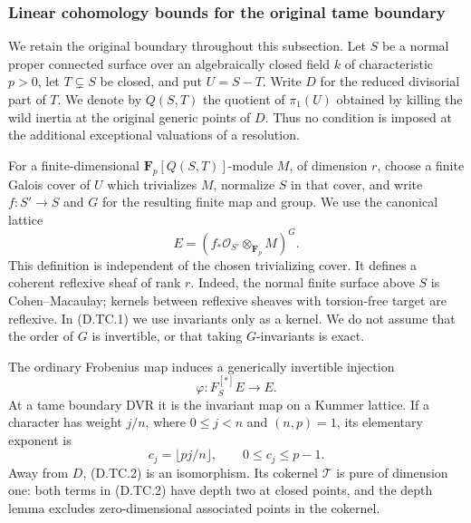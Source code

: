 \subsubsection{Linear cohomology bounds for the original tame boundary}

We retain the original boundary throughout this subsection.  Let $S$ be
a normal proper connected surface over an algebraically closed field $k$
of characteristic $p>0$, let $T\subsetneq S$ be closed, and put
$U=S-T$.  Write $D$ for the reduced divisorial part of $T$.  We denote by
$Q(S,T)$ the quotient of $\pi_1(U)$ obtained by killing the wild inertia
at the original generic points of $D$.  Thus no condition is imposed
at the additional exceptional valuations of a resolution.

For a finite-dimensional $\mathbf F_p[Q(S,T)]$-module $M$, of dimension
$r$, choose a finite Galois cover of $U$ which trivializes $M$, normalize
$S$ in that cover, and write $f:S'\to S$ and $G$ for the resulting
finite map and group.  We use the canonical lattice
\[
             E=(f_*\mathcal O_{S'}\otimes_{\mathbf F_p}M)^G.
                                                        \tag{D.TC.1}
\]
This definition is independent of the chosen trivializing cover.
It defines a coherent reflexive sheaf of rank $r$.  Indeed, the
normal finite surface above $S$ is Cohen--Macaulay; kernels between
reflexive sheaves with torsion-free target are reflexive.  In (D.TC.1)
we use invariants only as a kernel.  We do not assume that the order
of $G$ is invertible, or that taking $G$-invariants is exact.

The ordinary Frobenius map induces a generically invertible injection
\[
            \varphi:F_S^{[*]}E\longrightarrow E.          \tag{D.TC.2}
\]
At a tame boundary DVR it is the invariant map on a Kummer lattice.
If a character has weight $j/n$, where $0\le j<n$ and $(n,p)=1$,
its elementary exponent is
\[
                         c_j=\lfloor pj/n\rfloor,
                   \qquad 0\le c_j\le p-1.              \tag{D.TC.3}
\]
Away from $D$, (D.TC.2) is an isomorphism.  Its cokernel
$\mathcal T$ is pure of dimension one: both terms in (D.TC.2)
have depth two at closed points, and the depth lemma excludes
zero-dimensional associated points in the cokernel.

